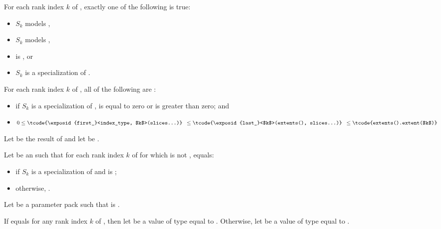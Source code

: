 \pnum
\mandates
For each rank index $k$ of ,
exactly one of the following is true:
\begin{itemize}
\item
$S_k$ models ,
\item
$S_k$ models ,
\item
{} is , or
\item
$S_k$ is a specialization of .
\end{itemize}

\pnum
\expects
For each rank index $k$ of ,
all of the following are :
\begin{itemize}
\item
if $S_k$ is a specialization of ,
 is equal to zero or
 is greater than zero; and
\item
$0            \leq \tcode{\exposid{first_}<index_type, $k$>(slices...)} \\
\hphantom{0 } \leq \tcode{\exposid{last_}<$k$>(extents(), slices...)} \\
\hphantom{0 } \leq \tcode{extents().extent($k$)}$
\end{itemize}

\pnum
Let  be
the result of  and
let  be .

\pnum
Let  be
an 
such that for each rank index $k$ of 
for which  is not ,
 equals:
\begin{itemize}
\item
{}
if $S_k$ is a specialization of  and
 is ;
\item
otherwise, .
\end{itemize}

\pnum
Let  be a parameter pack
such that 
is .

\pnum
If 
equals 
for any rank index $k$ of , then
let  be a value of type  equal to
.
Otherwise,
let  be a value of type  equal to
.

